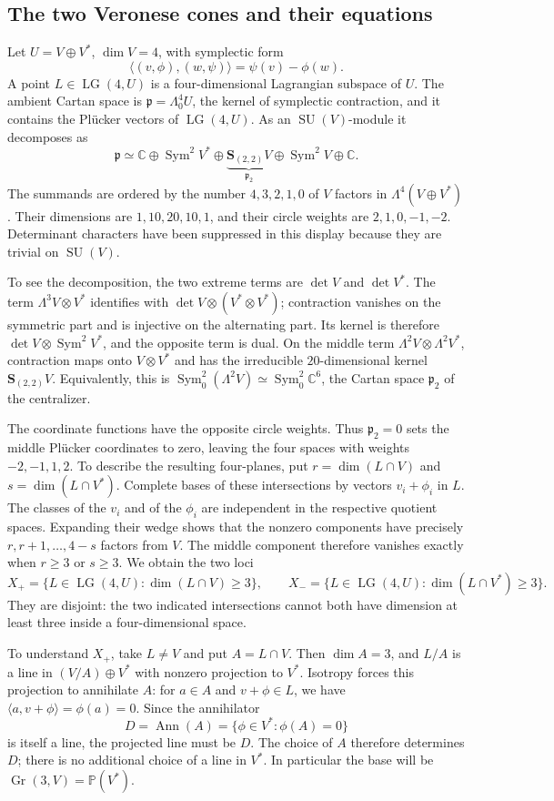 \documentclass[11pt]{article}
\newcommand{\C}{\mathbb C}
\newcommand{\PP}{\mathbb P}
\newcommand{\Gr}{\operatorname{Gr}}
\newcommand{\LG}{\operatorname{LG}}
\newcommand{\Sym}{\operatorname{Sym}}
\newcommand{\SU}{\operatorname{SU}}
\newcommand{\fp}{\mathfrak p}
\newcommand{\bS}{\mathbf S}
\theoremstyle{definition}
\numberwithin{equation}{section}
\begin{document}
\subsection{The two Veronese cones and their equations}
Let $U=V\oplus V^*$, $\dim V=4$, with symplectic form
\[
 \langle(v,\phi),(w,\psi)\rangle=\psi(v)-\phi(w).
\]
A point $L\in\LG(4,U)$ is a four-dimensional Lagrangian subspace of $U$.
The ambient Cartan space is $\fp=\Lambda^4_0U$, the kernel of
symplectic contraction, and it contains the Pl\"ucker vectors of
$\LG(4,U)$. As an $\SU(V)$-module it decomposes as
\[
 \fp\simeq\C\oplus\Sym^2V^*
       \oplus\underbrace{\bS_{(2,2)}V}_{\fp_2}
       \oplus\Sym^2V\oplus\C.
\]
The summands are ordered by the number $4,3,2,1,0$ of $V$ factors
in $\Lambda^4(V\oplus V^*)$. Their dimensions are $1,10,20,10,1$,
and their circle weights are $2,1,0,-1,-2$.
Determinant characters have been suppressed in this display because
they are trivial on $\SU(V)$.

To see the decomposition, the two extreme terms are $\det V$ and
$\det V^*$. The term $\Lambda^3V\otimes V^*$ identifies with
$\det V\otimes(V^*\otimes V^*)$; contraction vanishes on the
symmetric part and is injective on the alternating part. Its kernel
is therefore $\det V\otimes\Sym^2V^*$, and the opposite term is dual.
On the middle term $\Lambda^2V\otimes\Lambda^2V^*$, contraction
maps onto $V\otimes V^*$ and has the irreducible $20$-dimensional
kernel $\bS_{(2,2)}V$. Equivalently, this is
$\Sym^2_0(\Lambda^2V)\simeq\Sym^2_0\C^6$, the Cartan space $\fp_2$
of the centralizer.

The coordinate functions have the opposite circle weights.
Thus $\fp_2=0$ sets the middle Pl\"ucker coordinates to zero,
leaving the four spaces with weights $-2,-1,1,2$.
To describe the resulting four-planes, put
$r=\dim(L\cap V)$ and $s=\dim(L\cap V^*)$.
Complete bases of these intersections by vectors $v_i+\phi_i$ in $L$.
The classes of the $v_i$ and of the $\phi_i$ are independent in the
respective quotient spaces. Expanding their wedge shows that the
nonzero components have precisely $r,r+1,\ldots,4-s$ factors from $V$.
The middle component therefore vanishes exactly when $r\geq3$ or
$s\geq3$. We obtain the two loci
\[
 X_+=\{L\in\LG(4,U):\dim(L\cap V)\geq3\},\qquad
 X_-=\{L\in\LG(4,U):\dim(L\cap V^*)\geq3\}.
\]
They are disjoint: the two indicated intersections cannot both have
dimension at least three inside a four-dimensional space.

To understand $X_+$, take $L\ne V$ and put $A=L\cap V$.
Then $\dim A=3$, and $L/A$ is a line in $(V/A)\oplus V^*$
with nonzero projection to $V^*$. Isotropy forces this projection
to annihilate $A$: for $a\in A$ and $v+\phi\in L$, we have
$\langle a,v+\phi\rangle=\phi(a)=0$. Since the annihilator
\[
 D=\operatorname{Ann}(A)=\{\phi\in V^*: \phi(A)=0\}
\]
is itself a line, the projected line must be $D$. The choice of $A$
therefore determines $D$; there is no additional choice of a line in
$V^*$. In particular the base will be $\Gr(3,V)=\PP(V^*)$.
\end{document}

